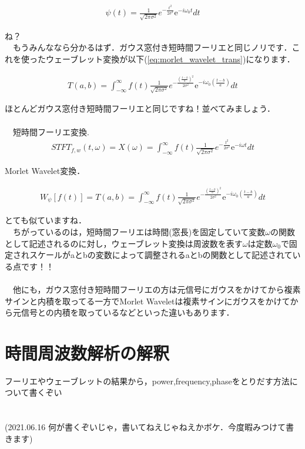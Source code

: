 \documentclass[11pt,a4paper]{ujreport} 	%
\begin{document}
\begin{eqnarray}
\psi(t) = \frac{1}{\sqrt{2\pi\sigma^2}}e^{-\frac{t^2}{2\sigma^2}}\mathrm{e}^{-i\omega_0 t} dt
\label{eq:morlet_wavelet}
\end{eqnarray}

ね？\\
　もうみんななら分かるはず．ガウス窓付き短時間フーリエと同じノリです．これを使ったウェーブレット変換が以下(\ref{eq:morlet_wavelet_trans})になります．

\begin{eqnarray}
T(a,b) =  \int_{-\infty}^{\infty} f(t) \frac{1}{\sqrt{2\pi\sigma^2}}e^{-\frac{(\frac{t-b}{a})^2}{2\sigma^2}}\mathrm{e}^{-i\omega_0 (\frac{t-b}{a})} dt
\label{eq:morlet_wavelet_trans}
\end{eqnarray}

ほとんどガウス窓付き短時間フーリエと同じですね！並べてみましょう．
\\\\
　短時間フーリエ変換.
\begin{eqnarray}
STFT_{f,w}(t, \omega) = X(\omega) = \int_{-\infty}^{\infty} f(t) \frac{1}{\sqrt{2\pi\sigma^2}}e^{-\frac{t^2}{2\sigma^2}}\mathrm{e}^{-i\omega t} dt
\end{eqnarray}


Morlet Wavelet変換．


\begin{eqnarray}
W_\psi[f(t)] = T(a,b) =  \int_{-\infty}^{\infty} f(t) \frac{1}{\sqrt{2\pi\sigma^2}}e^{-\frac{(\frac{t-b}{a})^2}{2\sigma^2}}\mathrm{e}^{-i\omega_0 (\frac{t-b}{a})} dt
\end{eqnarray}

とても似ていますね．\\
　ちがっているのは，短時間フーリエは時間(窓長)を固定していて変数$\omega$の関数として記述されるのに対し，ウェーブレット変換は周波数を表す$\omega$は定数$\omega_0$で固定されスケールがaとbの変数によって調整されるaとbの関数として記述されている点です！！\\
\\
　他にも，ガウス窓付き短時間フーリエの方は元信号にガウスをかけてから複素サインと内積を取ってる一方でMorlet Waveletは複素サインにガウスをかけてから元信号との内積を取っているなどといった違いもあります．

\section{時間周波数解析の解釈}
フーリエやウェーブレットの結果から，power,frequency,phaseをとりだす方法について書くぞい
\\
\\
\\
(2021.06.16 何が書くぞいじゃ，書いてねえじゃねえかボケ．今度暇みつけて書きます)
\end{document}
